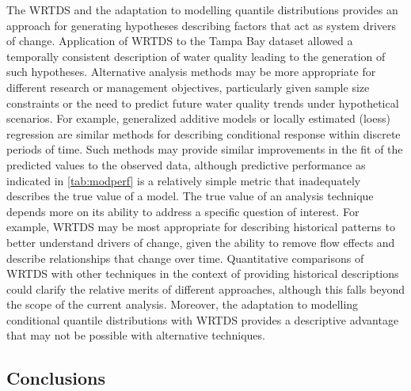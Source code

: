 \documentclass{svjour3}\usepackage[]{graphicx}\usepackage[]{color}
\begin{document}
The \ac{WRTDS} and the adaptation to modelling quantile distributions provides an approach for generating hypotheses describing factors that act as system drivers of change.  Application of \ac{WRTDS} to the Tampa Bay dataset allowed a temporally consistent description of water quality leading to the generation of such hypotheses.  Alternative analysis methods may be more appropriate for different research or management objectives, particularly given sample size constraints or the need to predict future water quality trends under hypothetical scenarios.  For example, generalized additive models or locally estimated (loess) regression are similar methods for describing conditional response within discrete periods of time.  Such methods may provide similar improvements in the fit of the predicted values to the observed data, although predictive performance as indicated in \cref{tab:modperf} is a relatively simple metric that inadequately describes the true value of a model. The true value of an analysis technique depends more on its ability to address a specific question of interest.  For example, \ac{WRTDS} may be most appropriate for describing historical patterns to better understand drivers of change, given the ability to remove flow effects and describe relationships that change over time.  Quantitative comparisons of \ac{WRTDS} with other techniques in the context of providing historical descriptions could clarify the relative merits of different approaches, although this falls beyond the scope of the current analysis.  Moreover, the adaptation to modelling conditional quantile distributions with \ac{WRTDS} provides a descriptive advantage that may not be possible with alternative techniques.

\subsection{Conclusions}
\end{document}
